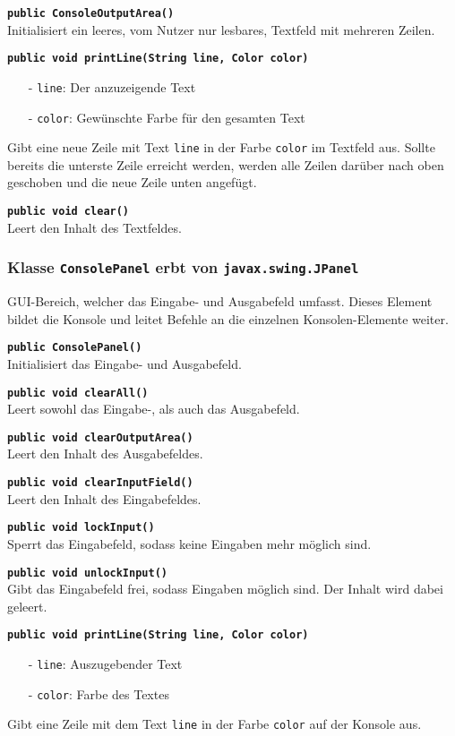 \documentclass[parskip=full,11pt,twoside]{scrartcl}
\begin{document}
\textbf{\texttt{public ConsoleOutputArea()}}\\
Initialisiert ein leeres, vom Nutzer nur lesbares, Textfeld mit mehreren Zeilen.

\textbf{\texttt{public void printLine(String line, Color color)}}
\begin{itemize}[noitemsep]
	\item[-] \texttt{line}: Der anzuzeigende Text
	\item[-] \texttt{color}: Gewünschte Farbe für den gesamten Text
\end{itemize}
Gibt eine neue Zeile mit Text \texttt{line} in der Farbe \texttt{color} im Textfeld aus. Sollte bereits die unterste Zeile erreicht werden, werden alle Zeilen darüber nach oben geschoben und die neue Zeile unten angefügt.

\textbf{\texttt{public void clear()}}\\
Leert den Inhalt des Textfeldes.

\subsubsection{Klasse \texttt{ConsolePanel} erbt von \texttt{javax.swing.JPanel}}

GUI-Bereich, welcher das Eingabe- und Ausgabefeld umfasst. Dieses Element bildet die Konsole und leitet Befehle an die einzelnen Konsolen-Elemente weiter.

\textbf{\texttt{public ConsolePanel()}}\\
Initialisiert das Eingabe- und Ausgabefeld.

\textbf{\texttt{public void clearAll()}}\\
Leert sowohl das Eingabe-, als auch das Ausgabefeld.

\textbf{\texttt{public void clearOutputArea()}}\\
Leert den Inhalt des Ausgabefeldes.

\textbf{\texttt{public void clearInputField()}}\\
Leert den Inhalt des Eingabefeldes.

\textbf{\texttt{public void lockInput()}}\\
Sperrt das Eingabefeld, sodass keine Eingaben mehr möglich sind.

\textbf{\texttt{public void unlockInput()}}\\
Gibt das Eingabefeld frei, sodass Eingaben möglich sind. Der Inhalt wird dabei geleert.

\textbf{\texttt{public void printLine(String line, Color color)}}\\
\begin{itemize}[noitemsep]
	\item[-] \texttt{line}: Auszugebender Text
	\item[-] \texttt{color}: Farbe des Textes
\end{itemize}
Gibt eine Zeile mit dem Text \texttt{line} in der Farbe \texttt{color} auf der Konsole aus.
\end{document}
